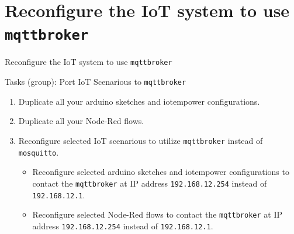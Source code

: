 \nopartpage
\part{Reconfigure the IoT system to use \texttt{mqttbroker}}
\withpartpage

\begin{frame}{Reconfigure the IoT system to use \texttt{mqttbroker}}
\begin{exampleblock}{Tasks (group): Port IoT Scenarious to \texttt{mqttbroker}}
  \begin{enumerate}
    \item \alert{Duplicate all} your \alert{arduino sketches} and \alert{iotempower configurations}.
    \item \alert{Duplicate all} your \alert{Node-Red flows}.
    \item Reconfigure selected \alert{IoT scenarious} to utilize \alert{\texttt{mqttbroker}} instead of \texttt{mosquitto}.
    \begin{itemize}
    \item Reconfigure selected \alert{arduino sketches} and \alert{iotempower} configurations to contact the \alert{\texttt{mqttbroker}} at IP address \alert{\texttt{192.168.12.254}} instead of \texttt{192.168.12.1}.
    \item Reconfigure selected \alert{Node-Red flows} to contact the \alert{\texttt{mqttbroker}} at IP address \alert{\texttt{192.168.12.254}} instead of \texttt{192.168.12.1}.
    \end{itemize}
  \end{enumerate}
  \end{exampleblock}
\end{frame}
